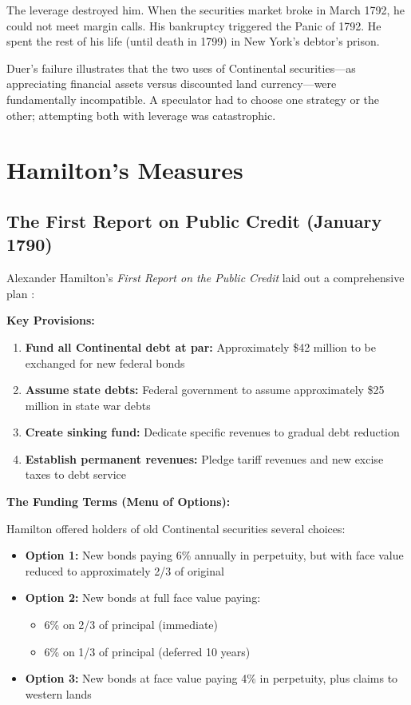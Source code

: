 \documentclass[12pt]{article}
\begin{document}
The leverage destroyed him. When the securities market broke in March 1792, he could not meet margin calls. His bankruptcy triggered the Panic of 1792. He spent the rest of his life (until death in 1799) in New York's debtor's prison.

Duer's failure illustrates that the two uses of Continental securities---as appreciating financial assets versus discounted land currency---were fundamentally incompatible. A speculator had to choose one strategy or the other; attempting both with leverage was catastrophic.

\section{Hamilton's Measures}\label{sec:hamilton}

\subsection{The First Report on Public Credit (January 1790)}

Alexander Hamilton's \textit{First Report on the Public Credit} laid out a comprehensive plan \citep{Hamilton1790}:

\textbf{Key Provisions:}
\begin{enumerate}
\item \textbf{Fund all Continental debt at par:} Approximately \$42 million to be exchanged for new federal bonds
\item \textbf{Assume state debts:} Federal government to assume approximately \$25 million in state war debts
\item \textbf{Create sinking fund:} Dedicate specific revenues to gradual debt reduction
\item \textbf{Establish permanent revenues:} Pledge tariff revenues and new excise taxes to debt service
\end{enumerate}

\textbf{The Funding Terms (Menu of Options):}

Hamilton offered holders of old Continental securities several choices:

\begin{itemize}
\item \textbf{Option 1:} New bonds paying 6\% annually in perpetuity, but with face value reduced to approximately 2/3 of original

\item \textbf{Option 2:} New bonds at full face value paying:
\begin{itemize}
\item 6\% on 2/3 of principal (immediate)
\item 6\% on 1/3 of principal (deferred 10 years)
\end{itemize}

\item \textbf{Option 3:} New bonds at face value paying 4\% in perpetuity, plus claims to western lands
\end{itemize}
\end{document}
